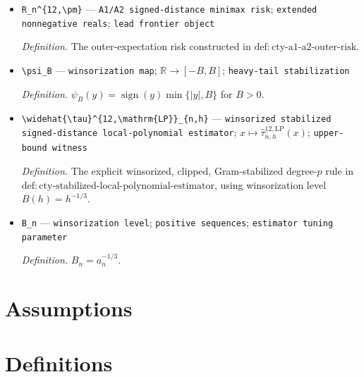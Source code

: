 \documentclass{article}
\begin{document}
\begin{itemize}
  \par\smallskip\noindent\emph{Definition.} The sectionwise-Borel class constructed in \(\mathrm{def:cty\text{-}a1\text{-}a2\text{-}point\text{-}indexed\text{-}decision\text{-}class}\).
  \item \texttt{R\_\allowbreak{}n\textasciicircum{}\{12,\allowbreak{}\textbackslash{}\allowbreak{}pm\}\allowbreak{}} --- \texttt{A1/\allowbreak{}A2 signed-\allowbreak{}distance minimax risk}; \texttt{extended nonnegative reals}; \texttt{lead frontier object}
  \par\smallskip\noindent\emph{Definition.} The outer-expectation risk constructed in \(\mathrm{def:cty\text{-}a1\text{-}a2\text{-}outer\text{-}risk}\).
  \item \texttt{\textbackslash{}\allowbreak{}psi\_\allowbreak{}B} --- \texttt{winsorization map}; \(\mathbb R\to[-B,B]\); \texttt{heavy-\allowbreak{}tail stabilization}
  \par\smallskip\noindent\emph{Definition.} \(\psi_B(y)=\operatorname{sign}(y)\min\{|y|,B\}\) for \(B>0\).
  \item \texttt{\textbackslash{}\allowbreak{}widehat\{\textbackslash{}\allowbreak{}tau\}\allowbreak{}\textasciicircum{}\{12,\allowbreak{}\textbackslash{}\allowbreak{}mathrm\{LP\}\allowbreak{}\}\allowbreak{}\_\allowbreak{}\{n,\allowbreak{}h\}\allowbreak{}} --- \texttt{winsorized stabilized signed-\allowbreak{}distance local-\allowbreak{}polynomial estimator}; \(x\mapsto\widehat\tau^{12,\mathrm{LP}}_{n,h}(x)\); \texttt{upper-\allowbreak{}bound witness}
  \par\smallskip\noindent\emph{Definition.} The explicit winsorized, clipped, Gram-stabilized degree-\(p\) rule in \(\mathrm{def:cty\text{-}stabilized\text{-}local\text{-}polynomial\text{-}estimator}\), using winsorization level \(B(h)=h^{-1/3}\).
  \item \texttt{B\_\allowbreak{}n} --- \texttt{winsorization level}; \texttt{positive sequences}; \texttt{estimator tuning parameter}
  \par\smallskip\noindent\emph{Definition.} \(B_n=a_n^{-1/3}\).
\end{itemize}

\section{Assumptions}

\section{Definitions}
\end{document}
